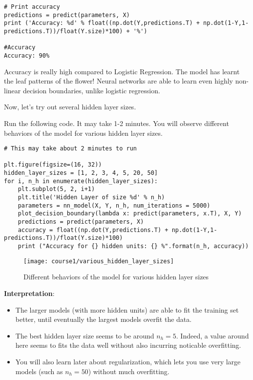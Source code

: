 \begin{verbatim}
# Print accuracy
predictions = predict(parameters, X)
print ('Accuracy: %d' % float((np.dot(Y,predictions.T) + np.dot(1-Y,1-predictions.T))/float(Y.size)*100) + '%')

#Accuracy
Accuracy: 90%
\end{verbatim}


Accuracy is really high compared to Logistic Regression. The model has learnt the leaf patterns of the flower! Neural networks are able to learn even highly non-linear decision boundaries, unlike logistic regression.

Now, let's try out several hidden layer sizes.



Run the following code. It may take 1-2 minutes. You will observe different behaviors of the model for various hidden layer sizes.

\begin{verbatim}
# This may take about 2 minutes to run

plt.figure(figsize=(16, 32))
hidden_layer_sizes = [1, 2, 3, 4, 5, 20, 50]
for i, n_h in enumerate(hidden_layer_sizes):
    plt.subplot(5, 2, i+1)
    plt.title('Hidden Layer of size %d' % n_h)
    parameters = nn_model(X, Y, n_h, num_iterations = 5000)
    plot_decision_boundary(lambda x: predict(parameters, x.T), X, Y)
    predictions = predict(parameters, X)
    accuracy = float((np.dot(Y,predictions.T) + np.dot(1-Y,1-predictions.T))/float(Y.size)*100)
    print ("Accuracy for {} hidden units: {} %".format(n_h, accuracy))
\end{verbatim}

\begin{figure}
\begin{center}
\texttt{[image: course1/various\_hidden\_layer\_sizes]}
\end{center}
\vspace{-0.5cm}
\caption{Different behaviors of the model for various hidden layer sizes}
\label{fig:various_hidden_layer_sizes}
\end{figure}


{\textbf {Interpretation}}:
\begin{itemize}
\item The larger models (with more hidden units) are able to fit the training set better, until eventually the largest models overfit the data.
\item The best hidden layer size seems to be around $n_h = 5$. Indeed, a value around here seems to fits the data well without also incurring noticable overfitting.
\item You will also learn later about regularization, which lets you use very large models (such as $n_h = 50$) without much overfitting.
\end{itemize}

